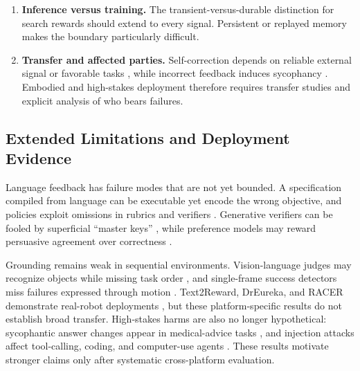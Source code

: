 \begin{enumerate}[leftmargin=1.6em]
    \item \textbf{Inference versus training.} The transient-versus-durable distinction for search rewards \citep{wei2025unifying} should extend to every signal. Persistent or replayed memory \citep{zhang2025survey} makes the boundary particularly difficult.
    \item \textbf{Transfer and affected parties.} Self-correction depends on reliable external signal or favorable tasks \citep{kamoi2024can}, while incorrect feedback induces sycophancy \citep{sharma2024towards}. Embodied and high-stakes deployment therefore requires transfer studies and explicit analysis of who bears failures.
\end{enumerate}

\subsection{Extended Limitations and Deployment Evidence}
\label{supp:subsec:limitations-evidence}

Language feedback has failure modes that are not yet bounded. A specification compiled from language can be executable yet encode the wrong objective, and policies exploit omissions in rubrics and verifiers \citep{mahmoud2026reward}. Generative verifiers can be fooled by superficial ``master keys'' \citep{zhao2025one}, while preference models may reward persuasive agreement over correctness \citep{sharma2024towards}.

Grounding remains weak in sequential environments. Vision-language judges may recognize objects while missing task order \citep{wybitul2024vista}, and single-frame success detectors miss failures expressed through motion \citep{hwang2024motif}. Text2Reward, DrEureka, and RACER demonstrate real-robot deployments \citep{xie2024text2reward,ma2024dreureka,dai2024racer}, but these platform-specific results do not establish broad transfer. High-stakes harms are also no longer hypothetical: sycophantic answer changes appear in medical-advice tasks \citep{fanous2025syceval}, and injection attacks affect tool-calling, coding, and computer-use agents \citep{dziemian2026how}. These results motivate stronger claims only after systematic cross-platform evaluation.
